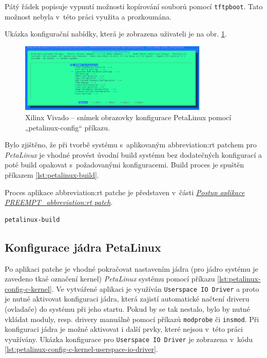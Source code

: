 \documentclass[a4paper, twoside, 11pt]{article}
\begin{document}
	Pátý řádek popisuje vypnutí možnosti kopírování souborů pomocí \texttt{tftpboot}. Tato možnost nebyla v~této práci využita a prozkoumána.\par
	Ukázka konfigurační nabídky, která je zobrazena uživateli je na obr. \ref{fig:terminal-petalinux-config}.\par

\begin{figure}[htbp!]
	\centering
	\includegraphics[width=0.80\textwidth]{src/jpg/terminal-petalinux-config-crop.jpg}
	\caption{Xilinx Vivado – snímek obrazovky konfigurace PetaLinux pomocí „petalinux-config“ příkazu.}
	\label{fig:terminal-petalinux-config}
\end{figure}


	Bylo zjištěno, že při tvorbě systému s~aplikovaným \gls{abbreviation:rt} patchem pro \textit{PetaLinux} je vhodné provést úvodní build systému bez dodatečných konfigurací a poté build opakovat s~požadovanými konfiguracemi. Build proces je spuštěn příkazem \ref{lst:petalinux-build}.\par
	Proces aplikace \gls{abbreviation:rt} patche je představen v~části \hyperref[subsubsec:postup-aplikace-preempt-rt-patch]{\textit{Postup aplikace PREEMPT\_\gls{abbreviation:rt} patch}}.\par

\begin{lstlisting}[language={sh}, caption={PetaLinux build příkaz pro vytvoření systému.}, label= {lst:petalinux-build}, morekeywords={petalinux-build, petalinux-package, petalinux-config}]
petalinux-build\end{lstlisting}

	\subsection{Konfigurace jádra PetaLinux}
	Po aplikaci patche je vhodné pokračovat nastavením jádra (pro jádro systému je zavedeno tkaé označení kernel) \textit{PetaLinux} systému pomocí příkazu \ref{lst:petalinux-config-c-kernel}. Ve vytvářené aplikaci je využíván \texttt{Userspace IO Driver} a proto je nutné aktivovat konfiguraci jádra, která zajistí automatické načtení driveru (ovladače) do systému při jeho startu. Pokud by se tak nestalo, bylo by nutné vkládat moduly, resp. drivery manuálně pomocí příkazů \texttt{modprobe} či \texttt{insmod}. Při konfiguraci jádra je možné aktivovat i další prvky, které nejsou v~této práci využívány. Ukázka konfigurace pro \texttt{Userspace IO Driver} je zobrazena v~kódu \ref{lst:petalinux-config-c-kernel-userspace-io-driver}.\par
\end{document}
